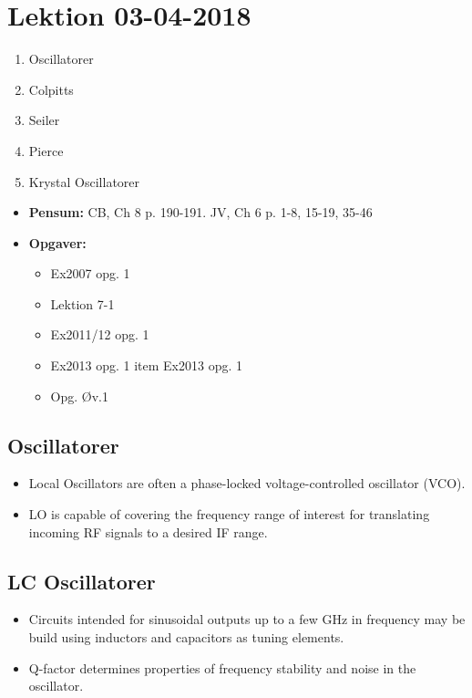\section{Lektion 03-04-2018}

\begin{enumerate}
	\item Oscillatorer
	\item Colpitts
	\item Seiler
	\item Pierce
	\item Krystal Oscillatorer
\end{enumerate}

\begin{mdframed}[style=exampledefault]
	\begin{itemize}
		\item \textbf{Pensum:} CB, Ch 8 p. 190-191. JV, Ch 6 p. 1-8, 15-19, 35-46
		\item \textbf{Opgaver:} 
		\begin{itemize}
			\item Ex2007 opg. 1
			\item Lektion 7-1
			\item Ex2011/12 opg. 1
			\item Ex2013 opg. 1
			item Ex2013 opg. 1
			\item Opg. Øv.1
		\end{itemize}
	\end{itemize}
\end{mdframed}

\subsection{Oscillatorer}
\begin{itemize}
	\item Local Oscillators are often a phase-locked voltage-controlled oscillator (VCO).
	\item LO is capable of covering the frequency range of interest for
	translating incoming RF signals to a desired IF range.
\end{itemize}

\subsection{LC Oscillatorer}
\begin{itemize}
	\item Circuits intended for sinusoidal outputs up to a few \si{\giga\hertz} in frequency may be build using inductors and capacitors as tuning elements.
	\item Q-factor determines properties of frequency stability and noise in the oscillator.
\end{itemize}

